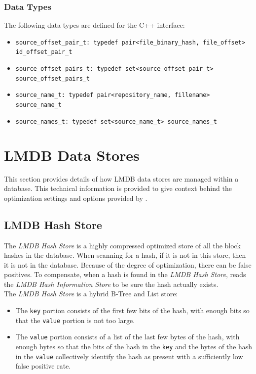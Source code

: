 \documentclass[11pt,fleqn]{article} %
\begin{document}
\subsubsection{Data Types}

The following data types are defined for the C++ interface:

\begin{itemize}
\item \verb+source_offset_pair_t: typedef pair<file_binary_hash, file_offset> id_offset_pair_t+
\item \verb+source_offset_pairs_t: typedef set<source_offset_pair_t> source_offset_pairs_t+
\item \verb+source_name_t: typedef pair<repository_name, fillename> source_name_t+
\item \verb+source_names_t: typedef set<source_name_t> source_names_t+
\end{itemize}

\section{LMDB Data Stores}
\label{LMDBDataStores}
This section provides details of how LMDB data stores are managed within a \hdb database. This technical information is provided to give context behind the optimization settings and options provided by \hdb.\\

\subsection{LMDB Hash Store}
The \textit{LMDB Hash Store} is a highly compressed optimized store of all the block hashes in the database.  When scanning for a hash, if it is not in this store, then it is not in the database.  Because of the degree of optimization, there can be false positives.  To compensate, when a hash is found in the \textit{LMDB Hash Store}, \hdb reads the \textit{LMDB Hash Information Store} to be sure the hash actually exists.\\

The \textit{LMDB Hash Store} is a hybrid B-Tree and List store:
\begin{itemize}
\item The \verb+key+ portion consists of the first few bits of the hash, with enough bits so that the \verb+value+ portion is not too large.
\item The \verb+value+ portion consists of a list of the last few bytes of the hash, with enough bytes so that the bits of the hash in the \verb+key+ and the bytes of the hash in the \verb+value+ collectively identify the hash as present with a sufficiently low false positive rate.
\end{itemize}
\end{document}
